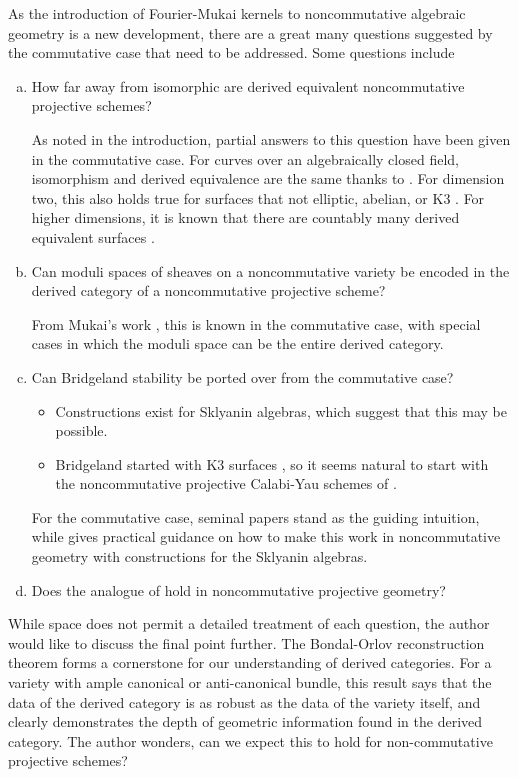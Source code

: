 \documentclass[11pt]{article}
\begin{document}
As the introduction of Fourier-Mukai kernels to noncommutative algebraic geometry is a new development, there are a great many questions suggested by the commutative case that need to be addressed.
Some questions include
\begin{enumerate}[(a)]
\item
  How far away from isomorphic are derived equivalent noncommutative projective schemes?

  As noted in the introduction, partial answers to this question have been given in the commutative case.
  For curves over an algebraically closed field, isomorphism and derived equivalence are the same thanks to \cite{Orlov1997}.
  For dimension two, this also holds true for surfaces that not elliptic, abelian, or K3 \cite[Prop. 12.1]{HuyFMT}.
  For higher dimensions, it is known that there are countably many derived equivalent surfaces \cite{AnToe}.
\item
  Can moduli spaces of sheaves on a noncommutative variety be encoded in the derived category of a noncommutative projective scheme?

  From Mukai's work \cite{Mukai81,Mukai87}, this is known in the commutative case, with special cases in which the moduli space can be the entire derived category.
\item
  Can Bridgeland stability be ported over from the commutative case?
  \begin{itemize}
  \item
    Constructions exist for Sklyanin algebras, which suggest that this may be possible.
  \item
    Bridgeland started with K3 surfaces \cite{Bri07,Bri08}, so it seems natural to start with the noncommutative projective Calabi-Yau schemes of \cite{kanazawa2015}.
  \end{itemize}

  For the commutative case, seminal papers \cite{Bri07, ABCH13, BM14a, BM14b} stand as the guiding intuition, while \cite{LiZhMMP} gives practical guidance on how to make this work in noncommutative geometry with constructions for the Sklyanin algebras.
    \item
    Does the analogue of \cite{Bondal-Orlov} hold in noncommutative projective geometry?
\end{enumerate}
While space does not permit a detailed treatment of each question, the author would like to discuss the final point further.
The Bondal-Orlov reconstruction theorem forms a cornerstone for our understanding of derived categories.
For a variety with ample canonical or anti-canonical bundle, this result says that the data of the derived category is as robust as the data of the variety itself, and clearly demonstrates the depth of geometric information found in the derived category.
The author wonders, can we expect this to hold for non-commutative projective schemes?
\end{document}
